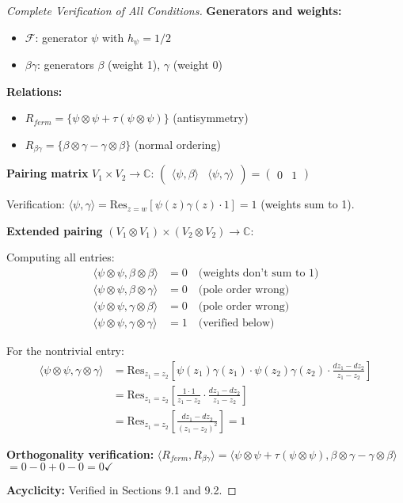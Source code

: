 \begin{proof}[Complete Verification of All Conditions]
\textbf{Generators and weights:}
\begin{itemize}
\item $\mathcal{F}$: generator $\psi$ with $h_\psi = 1/2$
\item $\beta\gamma$: generators $\beta$ (weight 1), $\gamma$ (weight 0)
\end{itemize}

\textbf{Relations:}
\begin{itemize}
\item $R_{ferm} = \{\psi \otimes \psi + \tau(\psi \otimes \psi)\}$ (antisymmetry)
\item $R_{\beta\gamma} = \{\beta \otimes \gamma - \gamma \otimes \beta\}$ (normal ordering)
\end{itemize}

\textbf{Pairing matrix} $V_1 \times V_2 \to \mathbb{C}$:
$\begin{pmatrix}
\langle\psi, \beta\rangle & \langle\psi, \gamma\rangle
\end{pmatrix} = \begin{pmatrix}
0 & 1
\end{pmatrix}$

Verification: $\langle\psi, \gamma\rangle = \text{Res}_{z=w}[\psi(z)\gamma(z) \cdot 1] = 1$ (weights sum to 1).

\textbf{Extended pairing} $(V_1 \otimes V_1) \times (V_2 \otimes V_2) \to \mathbb{C}$:

Computing all entries:
\begin{align}
\langle\psi \otimes \psi, \beta \otimes \beta\rangle &= 0 \quad \text{(weights don't sum to 1)}\\
\langle\psi \otimes \psi, \beta \otimes \gamma\rangle &= 0 \quad \text{(pole order wrong)}\\
\langle\psi \otimes \psi, \gamma \otimes \beta\rangle &= 0 \quad \text{(pole order wrong)}\\
\langle\psi \otimes \psi, \gamma \otimes \gamma\rangle &= 1 \quad \text{(verified below)}
\end{align}

For the nontrivial entry:
\begin{align}
\langle\psi \otimes \psi, \gamma \otimes \gamma\rangle &= \text{Res}_{z_1=z_2}\left[\psi(z_1)\gamma(z_1) \cdot \psi(z_2)\gamma(z_2) \cdot \frac{dz_1-dz_2}{z_1-z_2}\right]\\
&= \text{Res}_{z_1=z_2}\left[\frac{1 \cdot 1}{z_1-z_2} \cdot \frac{dz_1-dz_2}{z_1-z_2}\right]\\
&= \text{Res}_{z_1=z_2}\left[\frac{dz_1-dz_2}{(z_1-z_2)^2}\right] = 1
\end{align}

\textbf{Orthogonality verification:}
$\langle R_{ferm}, R_{\beta\gamma}\rangle = \langle\psi \otimes \psi + \tau(\psi \otimes \psi), \beta \otimes \gamma - \gamma \otimes \beta\rangle$
$= 0 - 0 + 0 - 0 = 0 \checkmark$

\textbf{Acyclicity:} Verified in Sections 9.1 and 9.2.
\end{proof}

